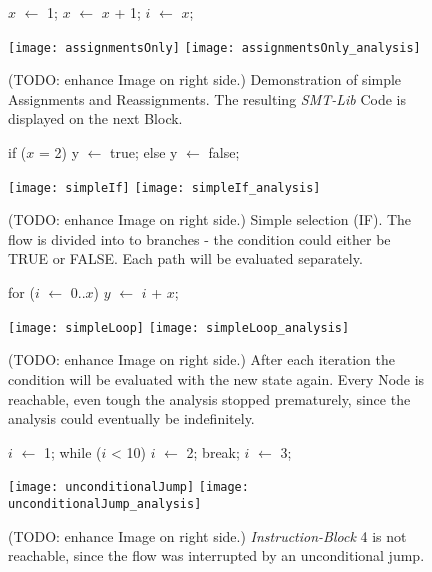 \begin{figure}[!h]
	\begin{GenericCode}
		$x$ $\leftarrow$ 1;
		$x$ $\leftarrow$ $x$ + 1;
		$i$ $\leftarrow$ $x$;
	\end{GenericCode}
	\centering
	\texttt{[image: assignmentsOnly]}
	\texttt{[image: assignmentsOnly\_analysis]}
	\caption{(TODO: enhance Image on right side.) Demonstration of simple Assignments and Reassignments. The resulting \emph{SMT-Lib} Code is displayed on the next Block.}
	\label{fig:assignmentOnly}
\end{figure}

\begin{figure}[!h]
	\begin{GenericCode}
		if ($x$ = 2) 
			y $\leftarrow$ true;
		else
			y $\leftarrow$ false;
	\end{GenericCode}
	\centering
	\texttt{[image: simpleIf]}
	\texttt{[image: simpleIf\_analysis]}
	  \caption{(TODO: enhance Image on right side.) Simple selection (IF). The flow is divided into to branches - the condition could either be TRUE or FALSE. Each path will be evaluated separately. }
	\label{fig:simpleIf}	
\end{figure}

\begin{figure}[!h]
	\begin{GenericCode}
		for ($i$ $\leftarrow$ 0..$x$) {
			$y$ $\leftarrow$ $i$ + $x$;
		}		
	\end{GenericCode}
	\centering
	\texttt{[image: simpleLoop]}
	\texttt{[image: simpleLoop\_analysis]}
	  \caption{(TODO: enhance Image on right side.) After each iteration the condition will be evaluated with the new state again. Every Node is reachable, even tough the analysis stopped prematurely, since the analysis could eventually be indefinitely. }
	\label{fig:simpleLoop}
\end{figure}

\begin{figure}[!h]
	\begin{GenericCode}
		$i$ $\leftarrow$ 1;
		while ($i$ < 10) {
			$i$ $\leftarrow$ 2;
			break;
			$i$ $\leftarrow$ 3;
		}
	\end{GenericCode}
	\centering
	\texttt{[image: unconditionalJump]}
	\texttt{[image: unconditionalJump\_analysis]}
	  \caption{(TODO: enhance Image on right side.) \emph{Instruction-Block} 4 is not reachable, since the flow was interrupted by an unconditional jump.}
	\label{fig:unconditionalJump}
\end{figure}

